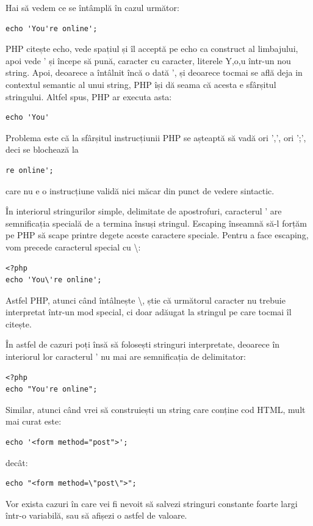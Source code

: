 Hai să vedem ce se întâmplă în cazul următor:
\begin{lstlisting}
echo 'You're online';
\end{lstlisting}
PHP citește {\glqq}echo{\grqq}, vede spațiul și îl acceptă pe {\glqq}echo{\grqq}
ca construct al limbajului, apoi vede ' și începe să
pună, caracter cu caracter, literele Y,o,u într-un nou string.
Apoi, deoarece a întâlnit încă o dată ', și deoarece tocmai se află
deja in contextul semantic al unui string, PHP își dă seama că
acesta e sfârșitul stringului. Altfel spus, PHP ar executa asta:
\begin{lstlisting}
echo 'You'
\end{lstlisting}
Problema este că la sfârșitul instrucțiunii PHP se așteaptă să
vadă ori ',', ori ';', deci se blochează la
\begin{lstlisting}
re online';
\end{lstlisting}
care nu e o instrucțiune validă nici măcar din punct
de vedere sintactic.

În interiorul stringurilor
simple, delimitate de apostrofuri, caracterul ' are semnificația
specială de a termina însuși stringul.
Escaping înseamnă să-l forțăm pe PHP să {\glqq}scape printre degete{\grqq}
aceste caractere speciale. Pentru a face escaping, vom precede caracterul
special cu \textbackslash:
\begin{lstlisting}
<?php
echo 'You\'re online';
\end{lstlisting}
Astfel PHP, atunci când întâlnește \textbackslash, știe că
următorul caracter nu trebuie interpretat într-un {\glqq}mod special{\grqq},
ci doar adăugat la stringul pe care tocmai îl citește.

În astfel de cazuri poți însă să folosești stringuri interpretate,
deoarece în interiorul lor caracterul ' nu mai are semnificația de
delimitator:
\begin{lstlisting}
<?php
echo "You're online";
\end{lstlisting}

Similar, atunci când vrei să construiești un string care conține
cod HTML, mult mai curat este:
\begin{lstlisting}
echo '<form method="post">';
\end{lstlisting}
decât:
\begin{lstlisting}
echo "<form method=\"post\">";
\end{lstlisting}



Vor exista cazuri în care vei fi nevoit să salvezi stringuri constante
foarte largi într-o variabilă, sau să afișezi o astfel de valoare.

